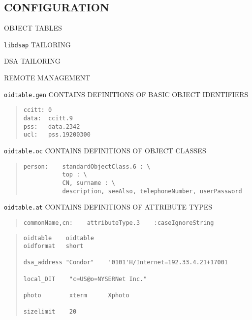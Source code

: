 \begin{bwslide}
\part*	{CONFIGURATION}\bf

\begin{nrtc}
\item	OBJECT TABLES

\item	\verb"libdsap" TAILORING

\item	DSA TAILORING

\item	REMOTE MANAGEMENT
\end{nrtc}
\end{bwslide}


\begin{bwslide}

\begin{nrtc}
\item	\verb"oidtable.gen" CONTAINS DEFINITIONS OF BASIC OBJECT IDENTIFIERS
\begin{quote}\small\begin{verbatim}
ccitt: 0
data:  ccitt.9
pss:   data.2342
ucl:   pss.19200300
\end{verbatim}\end{quote}

\item	\verb"oidtable.oc" CONTAINS DEFINITIONS OF OBJECT CLASSES
\begin{quote}\small\begin{verbatim}
person:    standardObjectClass.6 : \
           top : \
           CN, surname : \
           description, seeAlso, telephoneNumber, userPassword
\end{verbatim}\end{quote}

\item	\verb"oidtable.at" CONTAINS DEFINITIONS OF ATTRIBUTE TYPES
\begin{quote}\small\begin{verbatim}
commonName,cn:    attributeType.3    :caseIgnoreString
\end{verbatim}\end{quote}
\end{nrtc}
\end{bwslide}


\begin{bwslide}

\begin{quote}\small\begin{verbatim}
oidtable    oidtable
oidformat   short

dsa_address "Condor"    '0101'H/Internet=192.33.4.21+17001

local_DIT    "c=US@o=NYSERNet Inc."

photo        xterm      Xphoto

sizelimit    20
\end{verbatim}\end{quote}
\end{bwslide}


